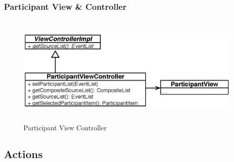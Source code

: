 \subsubsection{Participant View \& Controller}
\begin{figure}[H]
\begin{center}
  \includegraphics[height=2.15in, width=5.62in]{../images/finalreport/application_participantview.eps}
\caption{Participant View Controller}
\label{application_participantview}
\end{center}
\end{figure}



\subsection{Actions}

